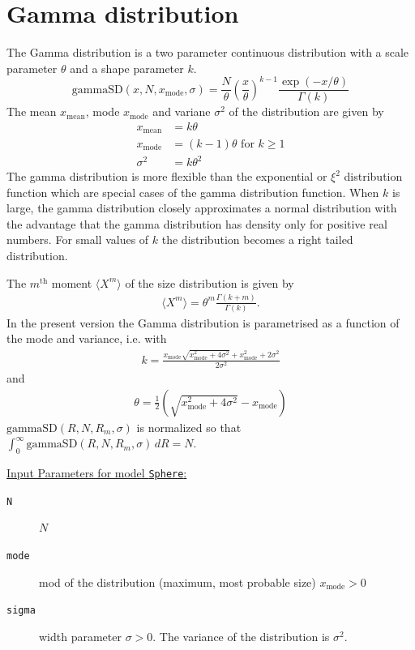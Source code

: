 \clearpage
\section{Gamma distribution}

The Gamma distribution is a two parameter continuous distribution with
a scale parameter $\theta$ and a shape parameter $k$.
\begin{equation}
\text{gammaSD}(x,N,x_\text{mode},\sigma) =  \frac{N}{\theta}
\left(\frac{x}{\theta}\right)^{k-1}
\frac{\exp(-x/\theta)}{\Gamma(k)} \label{GammaSDEq}
\end{equation}
The mean $x_\text{mean}$, mode $x_\text{mode}$ and variane $\sigma^2$
of the distribution are given by
\begin{align}
x_\text{mean}   &= k\theta \\
x_\text{mode}   &= (k-1)\theta \text{ for } k\geq 1 \\
\sigma^2        &= k\theta^2
\end{align}
The gamma distribution is more flexible than the exponential or $\xi^2$ distribution
function which are special cases of the gamma distribution function.
When $k$ is large, the gamma distribution closely approximates a normal distribution
with the advantage that the gamma distribution has density only for positive real
numbers. For small values of $k$ the distribution becomes a right tailed distribution.

The $m^\text{th}$ moment $\langle X^m\rangle$ of the size distribution is given by
\begin{align}
\langle X^m\rangle = \theta^m \frac{\Gamma(k+m)}{\Gamma(k)} .
\end{align}
In the present version the Gamma distribution is parametrised as a function
of the mode and variance, i.e.
with
\begin{align}
k=\frac{x_\text{mode} \sqrt{x_\text{mode}^2+4
   \sigma^2}+x_\text{mode}^2+2 \sigma ^2}{2 \sigma^2}
\end{align}
 and
\begin{align}
 \theta = \frac{1}{2}
   \left(\sqrt{x_\text{mode}^2+4 \sigma ^2}-x_\text{mode}\right)
\end{align}
$\text{gammaSD}(R,N,R_m,\sigma)$ is normalized so that
$\int_0^\infty\! \text{gammaSD}(R,N,R_m,\sigma)\,dR = N$.

\vspace{5mm}
\noindent \underline{Input Parameters for model \texttt{Sphere}:}
\begin{description}
\item[\texttt{N}]  $N$
\item[\texttt{mode}] mod of the distribution (maximum, most probable size) $x_\text{mode}>0$
\item[\texttt{sigma}] width parameter $\sigma>0$. The variance of the distribution is $\sigma^2$.
\end{description}

